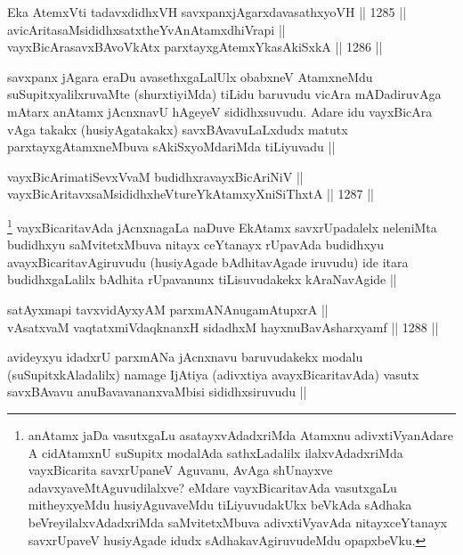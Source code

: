 \begin{shl}
Eka AtemxVti tadavxdidhxVH savxpanxjAgarxdavasathxyoVH ||  1285 ||  \\
avicAritasaMsididhxsatxtheYvAnAtamxdhiVrapi || \\
vayxBicArasavxBAvoVkAtx parxtayxgAtemxYkasAkiSxkA ||  1286 ||  
\end{shl}

\begin{artha}
savxpanx jAgara eraDu avasethxgaLalUlx obabxneV AtamxneMdu suSupitxyalilxruvaMte (shurxtiyiMda) tiLidu baruvudu vicAra mADadiruvAga mAtarx anAtamx jAcnxnavU hAgeyeV sididhxsuvudu. Adare idu vayxBicAra vAga takakx (husiyAgatakakx) savxBAvavuLaLxdudx matutx parxtayxgAtamxneMbuva sAkiSxyoMdariMda tiLiyuvadu ||
\end{artha}

\begin{shl}
vayxBicArimatiSevxVvaM budidhxravayxBicAriNiV || \\
vayxBicAritavxsaMsididhxheVtureYkAtamxyXniSiThxtA ||  1287 ||  
\end{shl}

\begin{artha}
\footnote{anAtamx jaDa vasutxgaLu asatayxvAdadxriMda Atamxnu adivxtiVyanAdare A cidAtamxnU suSupitx modalAda sathxLadalilx ilalxvAdadxriMda vayxBicarita savxrUpaneV Aguvanu, AvAga shUnayxve adavxyaveMtAguvudilalxve? eMdare vayxBicaritavAda vasutxgaLu mitheyxyeMdu husiyAguvaveMdu tiLiyuvudakUkx beVkAda sAdhaka beVreyilalxvAdadxriMda saMvitetxMbuva adivxtiVyavAda nitayxceYtanayx savxrUpaveV husiyAgade idudx sAdhakavAgiruvudeMdu opapxbeVku.}
vayxBicaritavAda jAcnxnagaLa naDuve EkAtamx savxrUpadalelx neleniMta budidhxyu saMvitetxMbuva nitayx ceYtanayx rUpavAda budidhxyu avayxBicaritavAgiruvudu (husiyAgade bAdhitavAgade iruvudu) ide itara budidhxgaLalilx bAdhita rUpavanunx tiLisuvudakekx kAraNavAgide ||
\end{artha}


\begin{shl}
satAyxmapi tavxvidAyxyAM parxmANAnugamAtupxrA || \\
vAsatxvaM vaqtatxmiVdaqknanxH sidadhxM hayxnuBavAsharxyamf ||  1288 || 
\end{shl}

\begin{artha}
avideyxyu idadxrU parxmANa jAcnxnavu baruvudakekx modalu (suSupitxkAladalilx) namage IjAtiya (adivxtiya avayxBicaritavAda) vasutx savxBAvavu anuBavavananxvaMbisi sididhxsiruvudu ||
\end{artha}

